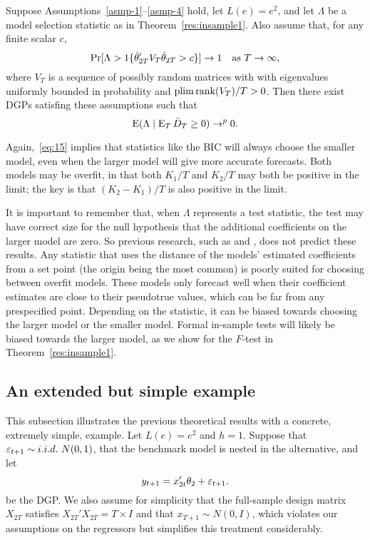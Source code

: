 \documentclass[12pt]{article}
\begin{document}
\begin{thm}\label{res:insample2}
  Suppose Assumptions~\ref{asmp-1}--\ref{asmp-4} hold, let $L(e) =
  e^2$, and let $\Lambda$ be a model selection statistic as in
  Theorem~\ref{res:insample1}. Also assume that, for any finite scalar
  $c$,
  \begin{equation}\label{eq:27}
    \Pr[\Lambda > \operatorname{1}\{\hat\theta_{2T}' V_T \hat\theta_{2T} > c \}] \to 1
    \quad \text{as } T \to \infty,
  \end{equation}
  where $V_T$ is a sequence of possibly random matrices with with
  eigenvalues uniformly bounded in probability and $\operatorname*{plim} \operatorname*{rank}(V_T)/T
  > 0$. Then there exist DGPs satisfing these assumptions such that
  \begin{equation}\label{eq:15}
    \operatorname{E}( \Lambda \mid \operatorname{E}_T \bar{D}_{T} \geq 0 ) \to^p 0.
  \end{equation}
\end{thm}

Again,~\eqref{eq:15} implies that statistics like the BIC will always
choose the smaller model, even when the larger model will give more
accurate forecasts. Both models may be overfit, in that both $K_1/T$
and $K_2/T$ may both be positive in the limit; the key is that $(K_2 -
K_1)/T$ is also positive in the limit.

It is important to remember that, when $\Lambda$ represents a test
statistic, the test may have correct size for the null hypothesis that
the additional coefficients on the larger model are zero. So previous
research, such as \citet{Cal:11c} and \citet{Ana:12}, does not predict
these results. Any statistic that uses the distance of the models'
estimated coefficients from a set point (the origin being the most
common) is poorly suited for choosing between overfit models. These
models only forecast well when their coefficient estimates are close
to their pseudotrue values, which can be far from any prespecified
point. Depending on the statistic, it can be biased towards choosing
the larger model or the smaller model. Formal in-sample tests will
likely be biased towards the larger model, as we show for the $F$-test
in Theorem~\ref{res:insample1}.

\subsection{An extended but simple example}
\label{sec:example}

This subsection illustrates the previous theoretical results with a
concrete, extremely simple, example. Let $L(e) = e^2$ and $h =
1$. Suppose that $\varepsilon_{t+1} \sim i.i.d.\ N(0,1)$, that the benchmark
model is nested in the alternative, and let
\begin{equation}
  y_{t+1} = x_{2t}'\theta_2 + \varepsilon_{t+1}.
\end{equation}
be the DGP. We also assume for simplicity that the full-sample design
matrix $X_{2T}$ satisfies $X_{2T}'X_{2T} = T \times I$ and that
$x_{T+1} \sim N(0, I)$, which violates our assumptions on the
regressors but simplifies this treatment considerably.
\end{document}
